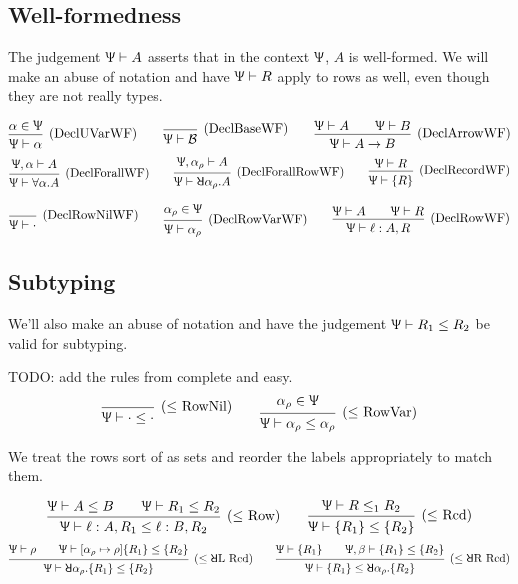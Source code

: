 \documentclass{article}
\newcommand{\declCtx}{\Uppsi}
\newcommand{\rcd}[1]{\{#1\}}
\newcommand{\B}{\mathcal{B}}
\newcommand{\rowall}{\rotatebox[origin=c]{180}{\(\mathsf{R}\)}}
\newcommand{\rowvar}{\alpha_\rho}
\newcommand{\spc}{\qquad}
\newcommand{\wf}[2]{#1 \vdash #2}
\newcommand{\subtype}{\le}
\newcommand{\subtypes}[3]{#1 \vdash #2 \le #3}
\newcommand{\deduct}[3][]
{
  \begin{prooftree}
    \hypo{#2}
    \infer1[\text{#1}]{#3}
  \end{prooftree}
}
\begin{document}
\subsection{Well-formedness}

The judgement \(\wf \declCtx A\) asserts that in the context \(\declCtx\), \(A\) is
well-formed. We will make an abuse of notation and have \(\wf \declCtx R\) apply to
rows as well, even though they are not really types.

\[
  \deduct[(DeclUVarWF)]
  {\alpha \in \declCtx}
  {\wf{\declCtx}{\alpha}}
  \spc
  \deduct[(DeclBaseWF)]
  {}
  {\wf{\declCtx}{\B}}
  \spc
  \deduct[(DeclArrowWF)]
  {\wf \declCtx A \spc \wf \declCtx B}
  {\wf \declCtx {A \to B}}
\]
\[
  \deduct[(DeclForallWF)]
  {\wf{\declCtx, \alpha}{A}}
  {\wf \declCtx {\forall \alpha. A}}
  \spc
  \deduct[(DeclForallRowWF)]
  {\wf{\declCtx, \rowvar}{A}}
  {\wf \declCtx {\rowall \rowvar. A}}
  \spc
  \deduct[(DeclRecordWF)]
  {\wf \declCtx R}
  {\wf \declCtx {\rcd{R}}}
\]

\[
  \deduct[(DeclRowNilWF)]
  {}
  {\wf \declCtx \cdot}
  \spc
  \deduct[(DeclRowVarWF)]
  {\rowvar \in \declCtx}
  {\wf \declCtx \rowvar}
  \spc
  \deduct[(DeclRowWF)]
  {\wf \declCtx A \spc \wf \declCtx R}
  {\wf \declCtx {\ell : A, R}}
\]

\subsection{Subtyping}
We'll also make an abuse of notation and have the judgement \(\subtypes{\declCtx}{R_1}{R_2}\) be valid for subtyping.

TODO: add the rules from complete and easy.
\[
  \deduct[(\(\subtype\) RowNil)]
  {}
  {\subtypes{\declCtx}{\cdot}{\cdot}}
  \spc
  \deduct[(\(\subtype\) RowVar)]
  {\rowvar \in \declCtx}
  {\subtypes{\declCtx}{\rowvar}{\rowvar}}
\]

We treat the rows sort of as sets and reorder the labels appropriately to match
them.

\[
  \deduct[(\(\subtype\) Row)]
  {\subtypes{\declCtx}{A}{B} \spc \subtypes{\declCtx}{R_1}{R_2}}
  {\subtypes \declCtx {\ell : A, R_1}{\ell : B, R_2}}
  \spc
  \deduct[(\(\subtype\) \text{Rcd})]
  {\subtypes \declCtx R_1 R_2}
  {\subtypes {\declCtx} {\rcd{R_1}} {\rcd{R_2}}}
\]
\[
  \deduct[(\(\subtype\rowall\)L Rcd)]
  {\wf \declCtx \rho \spc \subtypes \declCtx {[\rowvar \mapsto \rho]\rcd{R_1}} {\rcd{R_2}} }
  {\wf \declCtx \rowall \rowvar. \rcd{R_1} \le \rcd{R_2}}
  \spc
  \deduct[(\(\subtype\rowall\)R Rcd)]
  {\wf \declCtx {\rcd{R_1}} \spc \subtypes {\declCtx,\beta} {\rcd{R_1}} {\rcd{R_2}} }
  {\subtypes \declCtx {\rcd{R_1}} {\rowall \rowvar. \rcd{R_2}} }
\]
\end{document}
